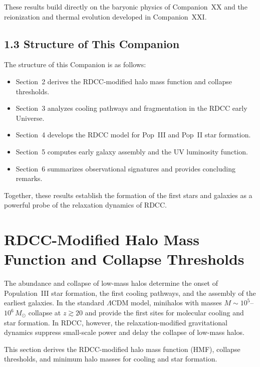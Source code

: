 \documentclass[11pt,a4paper]{article}
\begin{document}
These results build directly on the baryonic physics of Companion~XX and the reionization and 
thermal evolution developed in Companion~XXI.

\subsection*{1.3 Structure of This Companion}

The structure of this Companion is as follows:

\begin{itemize}
    \item Section~2 derives the RDCC-modified halo mass function and collapse thresholds.
    \item Section~3 analyzes cooling pathways and fragmentation in the RDCC early Universe.
    \item Section~4 develops the RDCC model for Pop~III and Pop~II star formation.
    \item Section~5 computes early galaxy assembly and the UV luminosity function.
    \item Section~6 summarizes observational signatures and provides concluding remarks.
\end{itemize}

Together, these results establish the formation of the first stars and galaxies as a powerful 
probe of the relaxation dynamics of RDCC.

\section{RDCC-Modified Halo Mass Function and Collapse Thresholds}

The abundance and collapse of low-mass halos determine the onset of Population~III star 
formation, the first cooling pathways, and the assembly of the earliest galaxies. In the 
standard $\Lambda$CDM model, minihalos with masses 
$M \sim 10^{5}$--$10^{6}\,M_{\odot}$ collapse at $z \gtrsim 20$ and provide the first sites 
for molecular cooling and star formation. In RDCC, however, the relaxation-modified 
gravitational dynamics suppress small-scale power and delay the collapse of low-mass halos.

This section derives the RDCC-modified halo mass function (HMF), collapse thresholds, and 
minimum halo masses for cooling and star formation.
\end{document}
